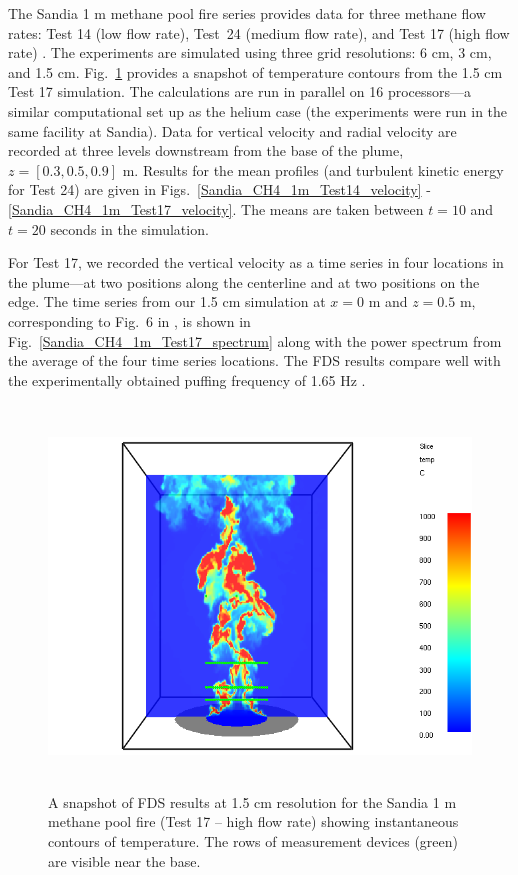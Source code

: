 The Sandia 1 m methane pool fire series provides data for three methane flow rates: Test 14 (low flow rate), Test~24 (medium flow rate), and Test 17 (high flow rate) \cite{Tieszen:2004}.  The experiments are simulated using three grid resolutions: 6 cm, 3 cm, and 1.5 cm.  Fig.~\ref{Sandia_CH4_1m_image} provides a snapshot of temperature contours from the 1.5 cm Test 17 simulation. The calculations are run in parallel on 16 processors---a similar computational set up as the helium case (the experiments were run in the same facility at Sandia).  Data for vertical velocity and radial velocity are recorded at three levels downstream from the base of the plume, $z = [0.3, 0.5, 0.9]$ m.  Results for the mean profiles (and turbulent kinetic energy for Test 24) are given in Figs.~\ref{Sandia_CH4_1m_Test14_velocity} - \ref{Sandia_CH4_1m_Test17_velocity}.  The means are taken between $t=10$ and $t=20$ seconds in the simulation.

For Test 17, we recorded the vertical velocity as a time series in four locations in the plume---at two positions along the centerline and at two positions on the edge.  The time series from our 1.5 cm simulation at $x=0$ m and $z=0.5$ m, corresponding to Fig.~6 in \cite{Tieszen:2002}, is shown in Fig.~\ref{Sandia_CH4_1m_Test17_spectrum} along with the power spectrum from the average of the four time series locations.  The FDS results compare well with the experimentally obtained puffing frequency of 1.65 Hz \cite{Tieszen:2002}.

\begin{figure}[h]
\begin{center}
\includegraphics[height=4in]{FIGURES/Sandia_Plumes/Sandia_CH4_1m_image}
\caption[Sandia 1~m methane pool fire instantaneous temperature contours.]{A snapshot of FDS results at 1.5 cm resolution for the Sandia 1 m methane pool fire (Test 17 -- high flow rate) showing instantaneous contours of temperature.  The rows of measurement devices (green) are visible near the base.}
\label{Sandia_CH4_1m_image}
\end{center}
\end{figure}

